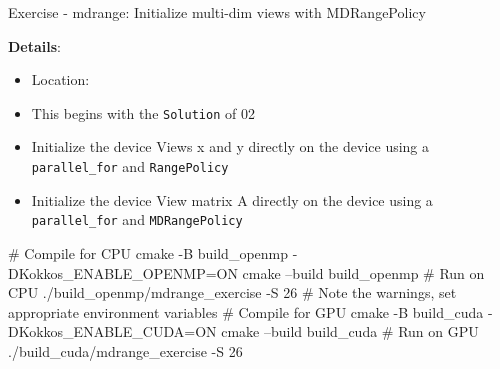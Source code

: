 \begin{frame}[fragile]{Exercise - mdrange: Initialize multi-dim views with MDRangePolicy}

  \textbf{Details}:
  \begin{small}
  \begin{itemize}
    \item Location: 
    \item This begins with the \texttt{Solution} of 02
    \item Initialize the device Views x and y directly on the device using a \texttt{parallel\_for} and \texttt{RangePolicy}
    \item Initialize the device View matrix A directly on the device using a \texttt{parallel\_for} and \texttt{MDRangePolicy}
  \end{itemize}
  \end{small}

\begin{code}
  # Compile for CPU
  cmake -B build_openmp -DKokkos_ENABLE_OPENMP=ON
  cmake --build build_openmp
  # Run on CPU
  ./build_openmp/mdrange_exercise -S 26
  # Note the warnings, set appropriate environment variables
  # Compile for GPU
  cmake -B build_cuda -DKokkos_ENABLE_CUDA=ON
  cmake --build build_cuda
  # Run on GPU
  ./build_cuda/mdrange_exercise -S 26
\end{code}

\end{frame}


